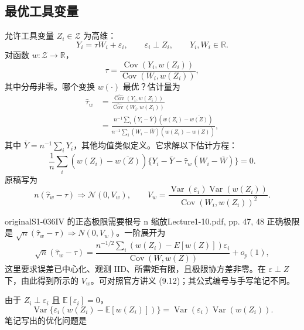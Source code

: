 \subsection{最优工具变量}
允许工具变量 $Z_i\in\mathcal Z$ 为高维：
\[
 Y_i=\tau W_i+\varepsilon_i,\qquad\varepsilon_i\perp Z_i,
 \qquad Y_i,W_i\in\mathbb R.
\]
对函数 $w:\mathcal Z\to\mathbb R$，
\[
 \tau=\frac{\operatorname{Cov}(Y_i,w(Z_i))}
 {\operatorname{Cov}(W_i,w(Z_i))},\tag{9.8}
\]
其中分母非零。哪个变换 $w(\cdot)$ 最优？估计量为
\begin{align*}
 \widehat\tau_w
 &=\frac{\widehat{\operatorname{Cov}}(Y_i,w(Z_i))}
 {\widehat{\operatorname{Cov}}(W_i,w(Z_i))}\\
 &=\frac{n^{-1}\sum_i(Y_i-\overline Y)(w(Z_i)-\overline{w(Z)})}
 {n^{-1}\sum_i(W_i-\overline W)(w(Z_i)-\overline{w(Z)})},\tag{9.9}
\end{align*}
其中 $\overline Y=n^{-1}\sum_iY_i$，其他均值类似定义。它求解以下估计方程：
\[
 \frac1n\sum_i(w(Z_i)-\overline{w(Z)})
 \{Y_i-\overline Y-\widehat\tau_w(W_i-\overline W)\}=0.\tag{9.10}
\]
原稿写为
\[
 n(\widehat\tau_w-\tau)\Rightarrow\mathcal N(0,V_w),
 \qquad
 V_w=\frac{\operatorname{Var}(\varepsilon_i)\operatorname{Var}(w(Z_i))}
 {\operatorname{Cov}(W_i,w(Z_i))^2}.\tag{9.11，原稿缩放}
\]
\begin{reviewnote}{original}{S1-036}{IV 的正态极限需要根号 n 缩放}{Lecture1-10.pdf, pp. 47, 48}
正确极限是 $\sqrt n(\widehat\tau_w-\tau)\Rightarrow N(0,V_w)$。一阶展开为
\[
\sqrt n(\widehat\tau_w-\tau)=
\frac{n^{-1/2}\sum_i(w(Z_i)-E[w(Z)])\varepsilon_i}
{\operatorname{Cov}(W,w(Z))}+o_p(1),
\]
这里要求误差已中心化、观测 IID、所需矩有限，且极限协方差非零。在 $\varepsilon\perp Z$ 下，由此得到所示的 $V_w$。可对照官方讲义 (9.12)；其公式编号与手写笔记不同。
\end{reviewnote}



由于 $Z_i\perp\varepsilon_i$ 且 $\mathbb E[\varepsilon_i]=0$，
\[
 \operatorname{Var}\{\varepsilon_i(w(Z_i)-\mathbb E[w(Z_i)])\}
 =\operatorname{Var}(\varepsilon_i)\operatorname{Var}(w(Z_i)).
\]
笔记写出的优化问题是

